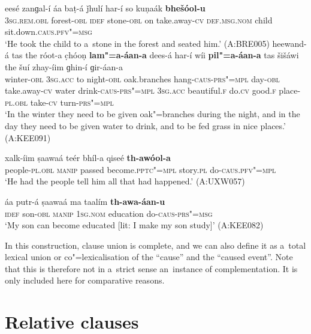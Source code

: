 \ea
\label{ex:13-184}
\gll eesé zanɡal-í áa baṭ-á ǰhulí har-í so kuṇaák \textbf{bhešóol-u}\\
\textsc{3sg.rem.obl} forest-\textsc{obl} \textsc{idef} stone-\textsc{obl} on take.away-\textsc{cv} \textsc{def.msg.nom} child sit.down.\textsc{caus}.\textsc{pfv"=msg}\\
\glt `He took the child to a~stone in the forest and seated him.' (A:BRE005)
\ex
\label{ex:13-185}
\gll heewand-á tas the róot-a c̣hóoṇ \textbf{lam"=a-áan-a} dees-á har-í wíi
\textbf{pil"=a-áan-a} tas šišáwi the šuí zhay-íim  ɡhin-í ɡir-áan-a\\
winter-\textsc{obl}  \textsc{3sg.acc}  to night-\textsc{obl} oak.branches  hang-\textsc{caus}-\textsc{prs"=mpl} day-\textsc{obl} take.away-\textsc{cv} water  drink-\textsc{caus}-\textsc{prs"=mpl} \textsc{3sg.acc} beautiful.\textsc{f} do.\textsc{cv} good.\textsc{f} place-\textsc{pl.obl} take-\textsc{cv} turn-\textsc{prs"=mpl} \\
\glt `In the winter they need to be given oak"=branches during the night, and in the day they need to be given water to drink, and to be fed grass in nice places.' (A:KEE091)

\ex
\label{ex:13-186}
\gll xalk-íim ṣaawaá teér bhíl-a qiseé \textbf{th-awóol-a}\\
people-\textsc{pl.obl} \textsc{manip} passed become.\textsc{pptc"=mpl} story.\textsc{pl} do-\textsc{caus}.\textsc{pfv"=mpl}\\
\glt `He had the people tell him all that had happened.' (A:UXW057)

\ex
\label{ex:13-187}
\gll áa putr-á ṣaawaá ma taalím \textbf{th-awa-áan-u}\\
\textsc{idef} son-\textsc{obl} \textsc{manip} \textsc{1sg.nom} education do-\textsc{caus}-\textsc{prs"=msg}\\
\glt `My son can become educated [lit: I make my son study]' (A:KEE082) 
\z

In this construction, clause union is complete, and we can also define it as a~total lexical union \citep[86]{noonan2007} or co"=lexicalisation of the ``cause'' and the ``caused event''. Note that this is therefore not in a~strict sense an~instance of complementation. It is only included here for comparative reasons.


\section{Relative clauses}
\label{sec:13-6}

